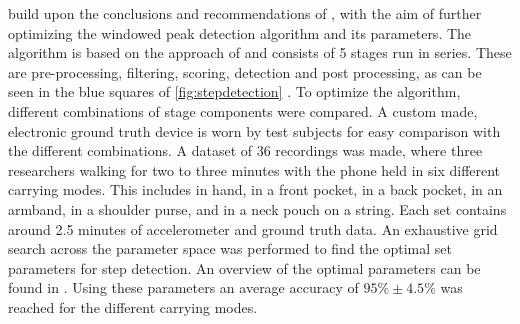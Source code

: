 \citet{Salvi2018} build upon the conclusions and recommendations of \citet{Brajdic2013}, with the aim of further optimizing the windowed peak detection algorithm and its parameters. The algorithm is based on the approach of \citet{Palshikar2009} and consists of 5 stages run in series. These are pre-processing, filtering, scoring, detection and post processing, as can be seen in the blue squares of \cref{fig:stepdetection} . To optimize the algorithm, different combinations of stage components were compared. A custom made, electronic ground truth device is worn by test subjects for easy comparison with the different combinations. A dataset of 36 recordings was made,  where three researchers walking for two to three minutes with the phone held in six different carrying modes. This includes in hand, in a front pocket, in a back pocket, in an armband, in a shoulder purse, and in a neck pouch on a string. Each set contains around 2.5 minutes of accelerometer and ground truth data. An exhaustive grid search across the parameter space was performed to find the optimal set parameters for step detection. An overview of the optimal parameters can be found in . Using these parameters an average accuracy of $95\% \pm 4.5\%$ was reached for the different carrying modes.

